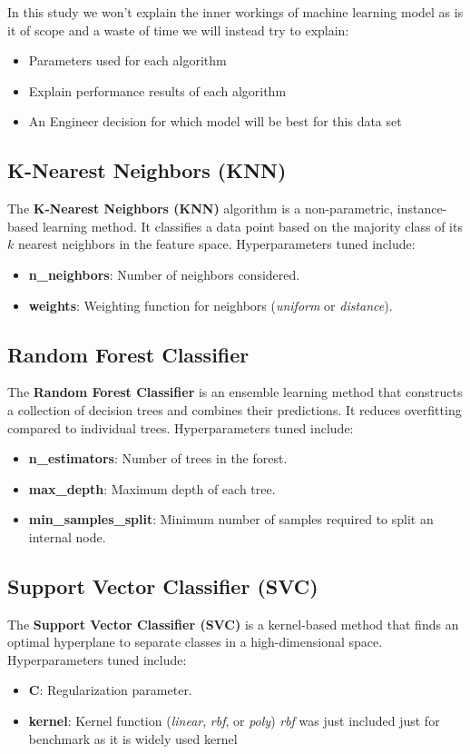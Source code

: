 \documentclass{article}
\begin{document}
In this study we won't explain the inner workings of machine learning model
as is it of scope and a waste of time we will instead try to explain:

\begin{itemize}
    \item Parameters used for each algorithm
    \item Explain performance results of each algorithm 
    \item An Engineer decision for which model will be best for this data set 
\end{itemize}

\subsection{K-Nearest Neighbors (KNN)}
The \textbf{K-Nearest Neighbors (KNN)} algorithm is a non-parametric, instance-based learning method. It classifies a data point based on the majority class of its $k$ nearest neighbors in the feature space. Hyperparameters tuned include:
\begin{itemize}
    \item \textbf{n\_neighbors}: Number of neighbors considered.
    \item \textbf{weights}: Weighting function for neighbors (\textit{uniform} or \textit{distance}).
\end{itemize}

\subsection{Random Forest Classifier}
The \textbf{Random Forest Classifier} is an ensemble learning method that constructs a collection of decision trees and combines their predictions. It reduces overfitting compared to individual trees. Hyperparameters tuned include:
\begin{itemize}
    \item \textbf{n\_estimators}: Number of trees in the forest.
    \item \textbf{max\_depth}: Maximum depth of each tree.
    \item \textbf{min\_samples\_split}: Minimum number of samples required to split an internal node.
\end{itemize}

\subsection{Support Vector Classifier (SVC)}
The \textbf{Support Vector Classifier (SVC)} is a kernel-based method that finds an optimal hyperplane to separate classes in a high-dimensional space. Hyperparameters tuned include:
\begin{itemize}
    \item \textbf{C}: Regularization parameter.
    \item \textbf{kernel}: Kernel function (\textit{linear}, \textit{rbf}, or \textit{poly})  \textit{rbf} was just included 
    just for benchmark as it is widely used kernel
\end{itemize}
\end{document}
